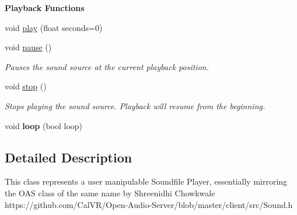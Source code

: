\begin{Indent}{\bf Playback Functions}\par
\begin{DoxyCompactItemize}
\item 
void \hyperlink{classColliderPlusPlus_1_1Sound_ae43b88fa91c65c281ca869a2061df608}{play} (float seconds=0)
\item 
\hypertarget{classColliderPlusPlus_1_1Sound_a2c0ff57814e80a5b99104bee71dbac13}{void \hyperlink{classColliderPlusPlus_1_1Sound_a2c0ff57814e80a5b99104bee71dbac13}{pause} ()}\label{classColliderPlusPlus_1_1Sound_a2c0ff57814e80a5b99104bee71dbac13}

\begin{DoxyCompactList}\small\item\em Pauses the sound source at the current playback position. \end{DoxyCompactList}\item 
\hypertarget{classColliderPlusPlus_1_1Sound_a7010e6bcdd47d51b359c364883574a5d}{void \hyperlink{classColliderPlusPlus_1_1Sound_a7010e6bcdd47d51b359c364883574a5d}{stop} ()}\label{classColliderPlusPlus_1_1Sound_a7010e6bcdd47d51b359c364883574a5d}

\begin{DoxyCompactList}\small\item\em Stops playing the sound source. Playback will resume from the beginning. \end{DoxyCompactList}\item 
\hypertarget{classColliderPlusPlus_1_1Sound_a2a2643c6ee9b4d535d1986072640d512}{void {\bfseries loop} (bool loop)}\label{classColliderPlusPlus_1_1Sound_a2a2643c6ee9b4d535d1986072640d512}

\end{DoxyCompactItemize}
\end{Indent}


\subsection{Detailed Description}
This class represents a user manipulable Soundfile Player, essentially mirroring the O\-A\-S class of the same name by Shreenidhi Chowkwale https\-://github.com/\-Cal\-V\-R/\-Open-\/\-Audio-\/\-Server/blob/master/client/src/\-Sound.\-h 

